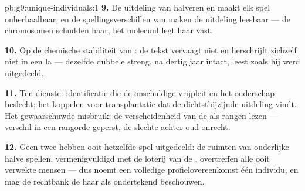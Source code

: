 \begin{solution}{pb:g9:unique-individuals:1}
\textbf{9.} De uitdeling van halveren en  maakt elk
spel onherhaalbaar, en de spellingsverschillen van  maken de
uitdeling leesbaar --- de chromosomen schudden haar, het molecuul
legt haar vast.

\textbf{10.} Op de chemische stabiliteit van : de tekst
vervaagt niet en herschrijft zichzelf niet in een la --- dezelfde
dubbele streng, na dertig jaar intact, leest zoals hij werd
uitgedeeld.

\textbf{11.} Ten dienste: identificatie die de onschuldige
vrijpleit en het ouderschap beslecht; het koppelen voor
transplantatie dat de dichtstbijzijnde uitdeling vindt. Het
gewaarschuwde misbruik: de verscheidenheid van de  als
rangen lezen --- verschil in een rangorde geperst, de slechte
 achter oud onrecht.

\textbf{12.} Geen twee  hebben ooit hetzelfde spel
uitgedeeld: de ruimten van ouderlijke halve spellen,
vermenigvuldigd met de loterij van de , overtreffen
alle ooit verwekte mensen --- dus noemt een volledige
profielovereenkomst één individu, en mag de rechtbank de haar als
ondertekend beschouwen.
\end{solution}
